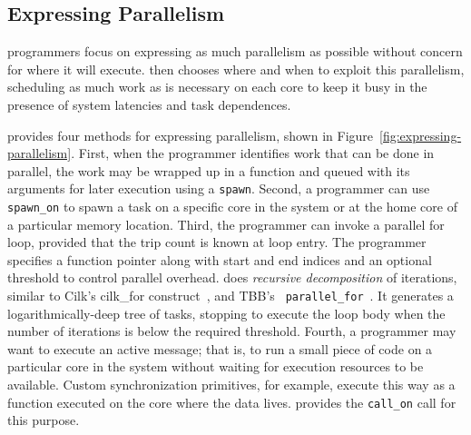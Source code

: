 \subsection{Expressing Parallelism}

\Grappa programmers focus on expressing as much parallelism as possible
without concern for where it will execute. \Grappa then chooses where and when
to exploit this parallelism, scheduling as much work as is necessary on each
core to keep it busy in the presence of system latencies and task dependences.

\Grappa provides four methods for expressing parallelism, shown in
Figure~\ref{fig:expressing-parallelism}. First, when the programmer identifies
work that can be done in parallel, the work may be wrapped up in a function
and queued with its arguments for later execution using a \texttt{spawn}.
Second, a programmer can use \texttt{spawn\_on} to spawn a task on a specific
core in the system or at the home core of a particular memory location. Third,
the programmer can invoke a parallel for loop, provided that the trip count is
known at loop entry. The programmer specifies a function pointer along with
start and end indices and an optional threshold to control parallel overhead.
\Grappa does {\em recursive decomposition} of iterations, similar to Cilk's
cilk\_for construct~\cite {cilkforimplementation}, and TBB's {\tt
parallel\_for}~\cite{intel_tbb}. It generates a logarithmically-deep tree of
tasks, stopping to execute the loop body when the number of iterations is
below the required threshold. Fourth, a programmer may want to execute an active message; that is, to run a
small piece of code on a particular core in the system without waiting for
execution resources to be available. Custom synchronization primitives, for example, execute this way as a function executed on the core where the data
lives. \Grappa provides the \texttt{call\_on} call for this purpose.

